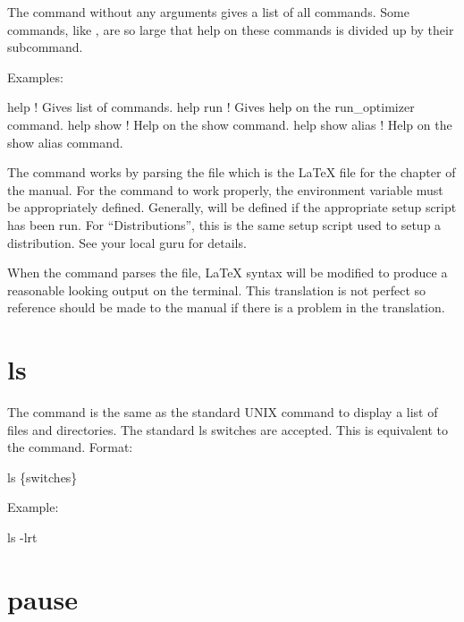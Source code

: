 \vskip 10pt
The  command without any arguments gives a list of all commands.  Some commands, like
, are so large that help on these commands is divided up by their subcommand.

Examples:
\begin{example}
  help            ! Gives list of commands.
  help run        ! Gives help on the run_optimizer command.
  help show       ! Help on the show command.
  help show alias ! Help on the show alias command.
\end{example}

The  command works by parsing the file  which is the
LaTeX file for the  chapter of the \tao manual. For the  command to work
properly, the environment variable  must be appropriately defined. Generally,
 will be defined if the appropriate \bmad setup script has been run. For
``Distributions'', this is the same setup script used to setup a distribution. See your local \bmad
guru for details.

When the  command parses the  file, LaTeX syntax will be
modified to produce a reasonable looking output on the terminal. This translation is not perfect so
reference should be made to the \tao manual if there is a problem in the translation.

\section{ls}
\label{s:ls}

The  command is the same as the standard UNIX  command to display a list of files and
directories. The standard ls switches are accepted. This is equivalent to the  command.
Format:
\begin{example}
  ls \{switches\}
\end{example}

Example:
\begin{example}
  ls -lrt
\end{example}

\section{pause}
\label{s:pause}

